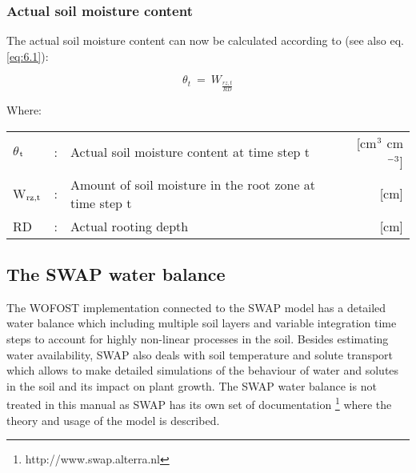\subsubsection{Actual soil moisture content}
The actual soil moisture content can now be calculated according to (see also eq. \ref{eq:6.1}):

\begin{equation}
\label{eq:6.34}
\theta _{t} ~=~ W _{\frac{rz, t}{RD}} 
\end{equation}

Where:\\[5pt]
\begin{tabularx}{\textwidth}{llXr}
	$\theta$$_{{\rm t}}$ &:& Actual soil moisture content at time step t  & [cm$^{{\rm 3}}$ cm$^{{\rm -3}}$]\\
	W$_{{\rm rz,t}}$ &:& Amount of soil moisture in the root zone at time step t  & [cm]\\
	RD &:& Actual rooting depth  & [cm]\\
\end{tabularx}

\subsection{The SWAP water balance}

The WOFOST implementation connected to the SWAP model has a detailed water balance which including 
multiple soil layers and variable integration time steps to account for highly non-linear processes 
in the soil. Besides estimating water availability, SWAP also deals with soil temperature and solute 
transport which allows to make 
detailed simulations of the behaviour of water and solutes in the soil and its impact on plant growth.
The SWAP water balance is not treated in this manual as SWAP has its own set of documentation 
\footnote{http://www.swap.alterra.nl} where the theory and usage of the model is described.
